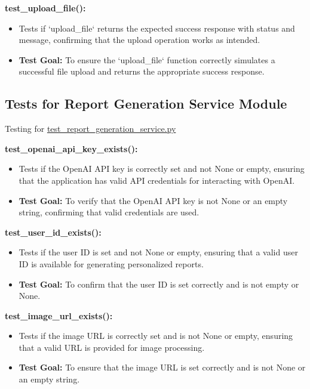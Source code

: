 \documentclass[12pt, titlepage]{article}
\begin{document}
\begin{enumerate}
\begin{enumerate}
\begin{enumerate}
\textbf{test\_upload\_file():}  
\begin{itemize}
    \item Tests if `upload\_file` returns the expected success response with status and message, confirming that the upload operation works as intended.
    \item \textbf{Test Goal:} To ensure the `upload\_file` function correctly simulates a successful file upload and returns the appropriate success response.
    \newline
\end{itemize}


\subsection{Tests for {Report Generation Service Module}}
Testing for \href{https://github.com/RezaJodeiri/CXR-Capstone/blob/main/src/backend/test/test_report_generation_service.py}{test\_report\_generation\_service.py}

\textbf{test\_openai\_api\_key\_exists():}  
\begin{itemize}
    \item Tests if the OpenAI API key is correctly set and not None or empty, ensuring that the application has valid API credentials for interacting with OpenAI.
    \item \textbf{Test Goal:} To verify that the OpenAI API key is not None or an empty string, confirming that valid credentials are used.
    \newline
\end{itemize}

\textbf{test\_user\_id\_exists():}  
\begin{itemize}
    \item Tests if the user ID is set and not None or empty, ensuring that a valid user ID is available for generating personalized reports.
    \item \textbf{Test Goal:} To confirm that the user ID is set correctly and is not empty or None.
    \newline
\end{itemize}

\textbf{test\_image\_url\_exists():}  
\begin{itemize}
    \item Tests if the image URL is correctly set and is not None or empty, ensuring that a valid URL is provided for image processing.
    \item \textbf{Test Goal:} To ensure that the image URL is set correctly and is not None or an empty string.
    \newline
\end{itemize}


\end{enumerate}
\end{enumerate}
\end{enumerate}
\end{document}
